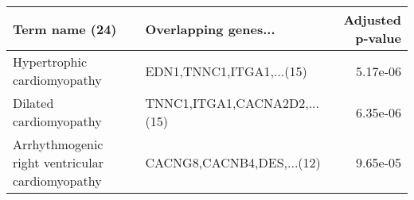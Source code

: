 \begin{tabular}{llr}
\toprule
                                 Term name (24) &         Overlapping genes... &  Adjusted p-value \\
\midrule
                    Hypertrophic cardiomyopathy &     EDN1,TNNC1,ITGA1,...(15) &          5.17e-06 \\
                         Dilated cardiomyopathy & TNNC1,ITGA1,CACNA2D2,...(15) &          6.35e-06 \\
Arrhythmogenic right ventricular cardiomyopathy &    CACNG8,CACNB4,DES,...(12) &          9.65e-05 \\
\bottomrule
\end{tabular}
